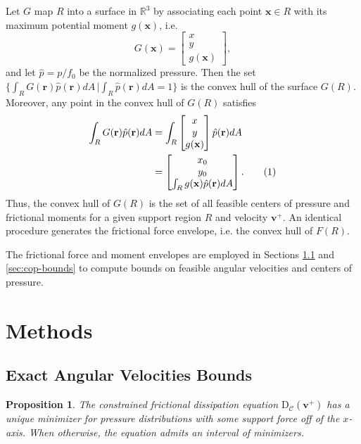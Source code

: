 \documentclass[conference]{IEEEtran}
\newtheorem{proposition}{Proposition}
\newcommand\numberthis{\addtocounter{equation}{1}\tag{\theequation}}
\begin{document}
Let $G$ map $R$ into a surface in $\mathbb{R}^3$ by associating each
point $\mathbf{x} \in R$ with its maximum potential moment
$g(\mathbf{x})$, i.e.
\begin{equation}
G(\mathbf{x}) =
\begin{bmatrix*}
  x\\
  y\\
  g(\mathbf{x})
\end{bmatrix*},
\end{equation}
and let $\hat{p} = p/f_0$ be the normalized pressure. Then the set
$\{\int_RG(\mathbf{r})\hat{p}(\mathbf{r})dA
\,|\int_R\hat{p}(\mathbf{r})dA=1 \}$
is the convex hull of the surface $G(R)$. Moreover, any point in the
convex hull of $G(R)$ satisfies
\begin{align*}
  \int_R G(\mathbf{r}) \hat{p}(\mathbf{r})dA &= \int_R 
  \begin{bmatrix*}
    x\\
    y\\
    g(\mathbf{x})
  \end{bmatrix*}
  \hat{p}(\mathbf{r})dA\\
  &= 
    \begin{bmatrix*}
      x_0\\
      y_0\\
      \int_R g(\mathbf{x}) \hat{p}(\mathbf{r})dA
    \end{bmatrix*}. \numberthis
\end{align*}
Thus, the convex hull of $G(R)$ is the set of all feasible centers of
pressure and frictional moments for a given support region $R$ and
velocity $\mathbf{v}^+$. An identical procedure generates the
frictional force envelope, i.e. the convex hull of $F(R)$.

The frictional force and moment envelopes are employed in Sections
\ref{sec:exact-angular-velocity-bounds} and \ref{sec:cop-bounds} to
compute bounds on feasible angular velocities and centers of pressure.

\section{Methods}\label{sec:methods}

\subsection{Exact Angular Velocities Bounds}\label{sec:exact-angular-velocity-bounds}

\begin{proposition}
  The constrained frictional dissipation equation
  $\mathrm{D}_{\mathcal{C}}(\mathbf{v}^+)$ has a unique minimizer for
  pressure distributions with some support force off of the
  $x$-axis. When otherwise, the equation admits an interval of
  minimizers.
\end{proposition}
\end{document}
